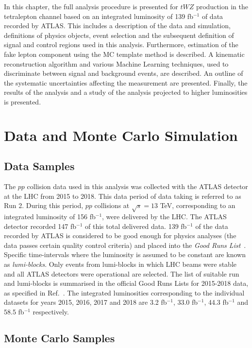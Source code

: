 

In this chapter, the full analysis procedure is presented for $tWZ$ production in the tetralepton channel based on an integrated luminosity of 139 fb$^{-1}$ of data recorded by ATLAS. This includes a description of the data and simulation, definitions of physics objects, event selection and the subsequent definition of signal and control regions used in this analysis. Furthermore, estimation of the fake lepton component using the MC template method is described. A kinematic reconstruction algorithm and various Machine Learning techniques, used to discriminate between signal and background events, are described. An outline of the systematic uncertainties affecting the measurement are presented. Finally, the results of the analysis and a study of the analysis projected to higher luminosities is presented. 


\section{Data and Monte Carlo Simulation}
\subsection{Data Samples}
The $pp$ collision data used in this analysis was collected with the ATLAS detector at the LHC from 2015 to 2018. This data period of data taking is referred to as Run 2. During this period, $pp$ collisions at $\sqrt{s}=13$ TeV, corresponding to an integrated luminosity of 156 fb$^{-1}$, were delivered by the LHC. The ATLAS detector recorded 147 fb$^{-1}$ of this total delivered data. 139 fb$^{-1}$ of the data recorded by ATLAS is considered to be good enough for physics analyses (the data passes certain quality control criteria) and placed into the \textit{Good Runs List}~\cite{goodrunslist}. Specific time-intervals where the luminosity is assumed to be constant are known as \textit{lumi-blocks}. Only events from lumi-blocks in which LHC beams were stable and all ATLAS detectors were operational are selected. The list of suitable run and lumi-blocks is summarised in the official Good Runs Lists for 2015-2018 data, as specified in Ref.~\cite{goodrunslist}. The integrated luminosities corresponding to the individual datasets for years 2015, 2016, 2017 and 2018 are 3.2 fb$^{-1}$, 33.0 fb$^{-1}$, 44.3 fb$^{-1}$ and 58.5 fb$^{-1}$ respectively.


\subsection{Monte Carlo Samples}
\label{sec:mcsamples}

